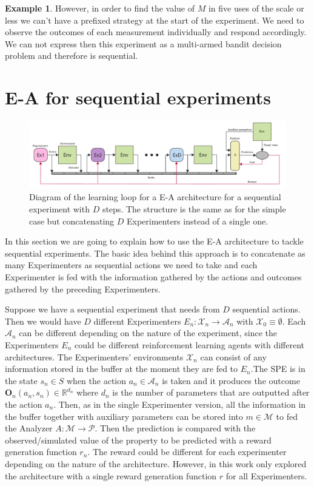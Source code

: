 \documentclass[11pt,a4paper,twoside]{report}
\newcommand{\+}{\textnormal{+} }
\theoremstyle{definition}
\newtheorem{myex}[mythm]{Example}
\numberwithin{equation}{chapter}
\begin{document}
\begin{myex}
However, in order to find the value of $M$ in five uses of the scale or less we
can't have a prefixed strategy at the start of the experiment. We need to
observe the outcomes of each measurement individually and respond accordingly.
We can not express then this experiment as a multi-armed bandit decision
problem and therefore is sequential.

\end{myex}

\section{E-A for sequential experiments}

\begin{figure}[t]
  \includegraphics[width=\columnwidth]{figures/sequential-EA.pdf}
  \caption{Diagram of the learning loop for a E-A architecture for a 
  sequential experiment with $D$ steps. The structure is the same as for 
  the simple case but concatenating $D$ Experimenters instead of a single one.}
  \label{fig:SequentialEA}
\end{figure}

In this section we are going to explain how to use the E-A architecture to
tackle sequential experiments. The basic idea behind this approach is to
concatenate as many Experimenters as sequential actions we need to take and each
Experimenter is fed with the information gathered by the actions and outcomes
gathered by the preceding Experimenters. 

Suppose we have a sequential experiment that needs from $D$ sequential actions.
Then we would have $D$ different Experimenters $E_n:\mathcal{X}_n\rightarrow
\mathcal{A}_n$ with $\mathcal{X}_0\equiv\emptyset$. Each $\mathcal{A}_n$ can be
different depending on the nature of the experiment, since the Experimenters
$E_n$ could be different reinforcement learning agents with different
architectures. The Experimenters' environments $\mathcal{X}_n$ can consist of
any information stored in the buffer at the moment they are fed to $E_n$.The SPE
is in the state $s_n \in S$ when the action $a_n \in \mathcal{A}_n$ is taken and
it produces the outcome $\textbf{O}_n(a_n, s_n) \in \mathbb{R}^{d_n}$ where
$d_n$ is the number of parameters that are outputted after the action $a_n$.
Then, as in the single Experimenter version, all the information in the buffer
together with auxiliary parameters can be stored into $m\in\mathcal{M}$ to fed
the Analyzer $A:\mathcal{M}\rightarrow \mathcal{P}$. Then the prediction is
compared with the observed/simulated value of the property to be predicted
with a reward generation function $r_n$. The reward could be different for each
experimenter depending on the nature of the architecture. However, in this work
only explored the architecture with a single reward generation function $r$ for
all Experimenters.
\end{document}
